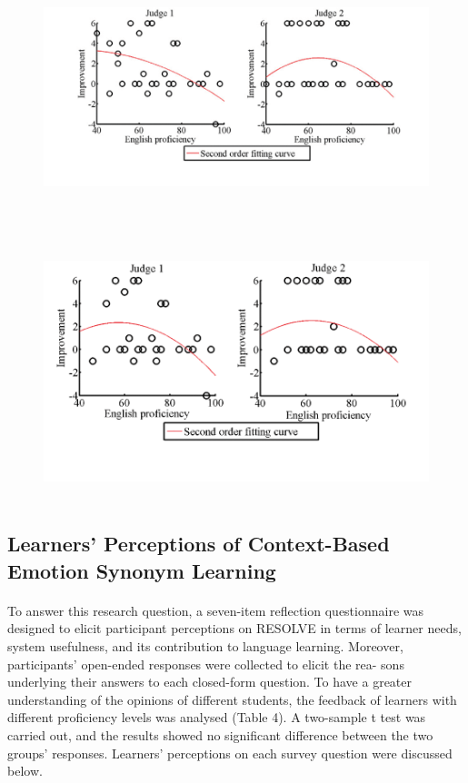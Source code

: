 \documentclass[a4paper,12pt,oneside]{article}
\begin{document}
\begin{figure}[H]
\includegraphics[height=7.5cm,width=16cm]{Figure4.png}
\centering
\end{figure}


\begin{figure}[H]
\includegraphics[height=7.5cm,width=16cm]{Figure5.png}
\centering
\end{figure}

\subsection{Learners’ Perceptions of Context-Based Emotion Synonym Learning}
\paragraph{}
To answer this research question, a seven-item reflection questionnaire was designed to elicit participant perceptions on RESOLVE in terms of learner needs, system usefulness, and its contribution to language learning. Moreover, participants’ open-ended responses were collected to elicit the rea- sons underlying their answers to each closed-form question. To have a greater understanding of the opinions of different students, the feedback of learners with different proficiency levels was analysed (Table 4). A two-sample t test was carried out, and the results showed no significant difference between the two groups’ responses. Learners’ perceptions on each survey question were discussed below. 
\end{document}
